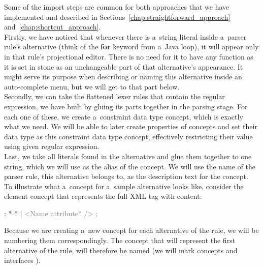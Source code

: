 Some of the import steps are common for both approaches that we have implemented and described in Sections~\ref{chap:straightforward_approach} and~\ref{chap:shortcut_approach}.
\\

Firstly, we have noticed that whenever there is a~string literal inside a~parser rule's alternative (think of the \textbf{for} keyword from a~Java loop), it will appear only in that rule's projectional editor.
There is no need for it to have any function as it is set in stone as an unchangeable part of that alternative's appearance.
It might serve its purpose when describing or naming this alternative inside an auto-complete menu, but we will get to that part below.
\\

Secondly, we can take the flattened lexer rules that contain the regular expression, we have built by gluing its parts together in the parsing stage.
For each one of these, we create a~constraint data type concept, which is exactly what we need.
We will be able to later create properties of concepts and set their data type as this constraint data type concept, effectively restricting their value using given regular expression.
\\

Last, we take all literals found in the alternative and glue them together to one string, which we will use as the alias of the concept.
We will use the name of the parser rule, this alternative belongs to, as the description text for the concept.
\\

To illustrate what a~concept for a~sample alternative looks like, consider the element concept that represents the full XML tag with content:

\begin{antlr}
	      :   \literal{<}  * \literal{>} * \literal{</}  \literal{>}
             \textcolor{gray}{|   \ap<\ap Name attribute* \ap/>\ap}
             \textcolor{gray}{;}
\end{antlr}

Because we are creating a~new concept for each alternative of the rule, we will be numbering them correspondingly.
The concept that will represent the first alternative of the  rule, will therefore be named 
(we will mark concepts  and interfaces ).

